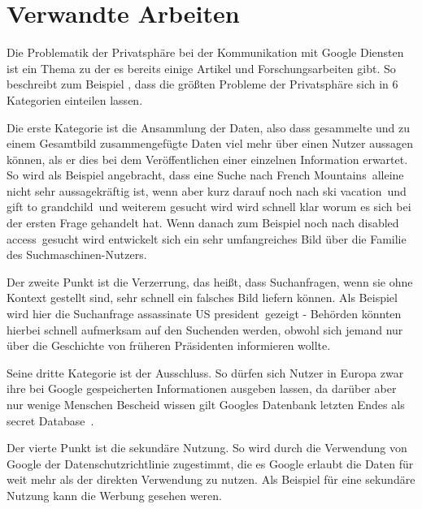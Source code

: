 % 
% 

\chapter{Verwandte Arbeiten}
Die Problematik der Privatsphäre bei der Kommunikation mit Google Diensten ist ein Thema zu der es bereits einige Artikel und Forschungsarbeiten gibt. So beschreibt zum Beispiel \citet{tene2007google}, dass die größten Probleme der Privatsphäre sich in 6 Kategorien einteilen lassen.

Die erste Kategorie ist die Ansammlung der Daten, also dass gesammelte und zu einem Gesamtbild zusammengefügte Daten viel mehr über einen Nutzer aussagen können, als er dies bei dem Veröffentlichen einer einzelnen Information erwartet. So wird als Beispiel angebracht, dass eine Suche nach \glqq French Mountains\grqq\ alleine nicht sehr aussagekräftig ist, wenn aber kurz darauf noch nach \glqq ski vacation\grqq\ und \glqq gift to grandchild\grqq\ und weiterem gesucht wird wird schnell klar worum es sich bei der ersten Frage gehandelt hat. Wenn danach zum Beispiel noch nach \glqq disabled access\grqq\ gesucht wird entwickelt sich ein sehr umfangreiches Bild über die Familie des Suchmaschinen-Nutzers. 

Der zweite Punkt ist die Verzerrung, das heißt, dass Suchanfragen, wenn sie ohne Kontext gestellt sind, sehr schnell ein falsches Bild liefern können. Als Beispiel wird hier die Suchanfrage \glqq assassinate US president\grqq\ gezeigt - Behörden könnten hierbei schnell aufmerksam auf den Suchenden werden, obwohl sich jemand nur über die Geschichte von früheren Präsidenten informieren wollte.

Seine dritte Kategorie ist der Ausschluss. So dürfen sich Nutzer in Europa zwar ihre bei Google gespeicherten Informationen ausgeben lassen, da darüber aber nur wenige Menschen Bescheid wissen gilt Googles Datenbank letzten Endes als \glqq secret Database\grqq\ . 

Der vierte Punkt ist die \glqq sekundäre Nutzung\grqq . So wird durch die Verwendung von Google der Datenschutzrichtlinie zugestimmt, die es Google erlaubt die Daten für weit mehr als der direkten Verwendung zu nutzen. Als Beispiel für eine sekundäre Nutzung kann die Werbung gesehen weren. 

